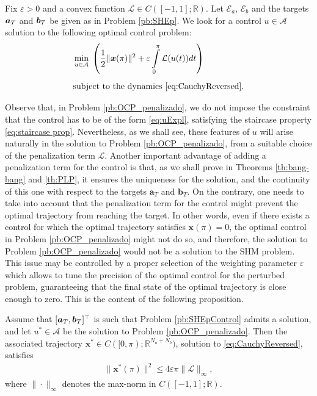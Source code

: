 \documentclass[twocolumn]{autart}    %
\begin{document}
\vspace{0.5em}
\begin{problem}\label{pb:OCP_penalizado}
	Fix $\varepsilon>0$ and a convex function $\mathcal{L}\in C([-1,1];\mathbb{R})$.  Let $\mathcal{E}_a$, $\mathcal{E}_b$ and the targets $\bm{a}_T$ and $\bm{b}_T$ be given as in Problem \ref{pb:SHEp}. We look for a control $u\in \mathcal A$ solution to the following optimal control problem:
	\begin{align*}
		&\displaystyle\min_{u \in \mathcal A}\;\left(\dfrac{1}{2} \|\bm{x}(\pi)\|^2 + \varepsilon \displaystyle\int_0^\pi \mathcal{L}(u(t)) dt\right) 
		\\[5pt] 
		&\text{subject to the dynamics \eqref{eq:CauchyReversed}}.
	\end{align*}
\end{problem}
Observe that, in Problem \ref{pb:OCP_penalizado}, we do not impose the constraint that the control has to be of the form \eqref{eq:uExpl}, satisfying the staircase property \eqref{eq:staircase prop}. Nevertheless, as we shall see, these features of $u$ will arise naturally in the solution to Problem \ref{pb:OCP_penalizado}, from a suitable choice of the penalization term $\mathcal{L}$. Another important advantage of adding a penalization term for the control is that, as we shall prove in Theorems \ref{th:bang-bang} and \ref{th:PLP}, it ensures the uniqueness for the solution, and the continuity of this one with respect to the targets $\bm{a}_T$ and $\bm{b}_T$. On the contrary, one needs to take into account that the penalization term for the control might prevent the optimal trajectory from reaching the target. In other words, even if there exists a control for which the optimal trajectory satisfies $\bm{x} (\pi) = 0$, the optimal control in Problem \ref{pb:OCP_penalizado} might not do so, and therefore, the solution to Problem \ref{pb:OCP_penalizado} would not be a solution to the SHM problem. This issue may be controlled by a proper selection of the weighting parameter $\varepsilon$ which allows to tune the precision of the optimal control for the perturbed problem, guaranteeing that the final state of the optimal trajectory is close enough to zero. This is the content of the following proposition.

\vspace{0.5em}
\begin{proposition}\label{Prop:approx controllability}
	Assume that $[\bm{a}_T,\bm{b}_T]^\top$ is such that Problem \ref{pb:SHEpControl} admits a solution, and let $u^\ast\in \mathcal A$ be the solution to Problem \ref{pb:OCP_penalizado}. Then the associated trajectory $\bm{x}^\ast\in C([0,\pi);\mathbb{R}^{N_a+N_b})$, solution to \eqref{eq:CauchyReversed}, satisfies
	\begin{align*} 
		\| \bm{x}^\ast (\pi)  \|^2 \leq  4 \varepsilon \pi \| \mathcal{L}\|_\infty,
	\end{align*}
	where $\| \cdot\|_\infty$ denotes the max-norm in $C([-1,1]; \mathbb{R})$.
\end{proposition}
\end{document}
